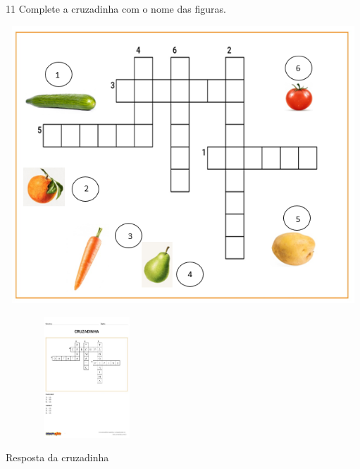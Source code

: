 \num{11} Complete a cruzadinha com o nome das figuras.


\includegraphics[width=5.69167in,height=4.10139in]{media/image40.png}

\includegraphics[width=2.40385in,height=1.79075in]{media/image41.jpeg}

Resposta da cruzadinha


